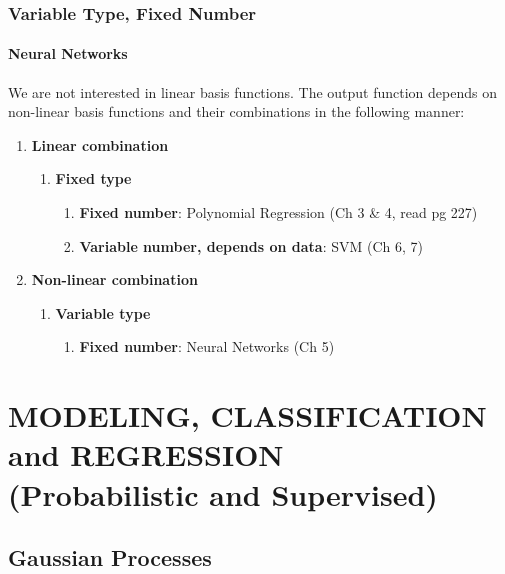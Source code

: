 \documentclass{book}
\begin{document}
\section{Variable Type, Fixed Number} 
\subsection{Neural Networks}

We are not interested in linear basis functions.
The output function depends on non-linear basis functions and their combinations in the following manner:

\begin{enumerate}
\item {\color{red}\textbf{Linear combination}}
\begin{enumerate}
\item {\color{OliveGreen}\textbf{Fixed type}}
\begin{enumerate}
\item {\color{blue}\textbf{Fixed number}}: Polynomial Regression (Ch 3 \& 4, read pg 227) 
\item {\color{blue}\textbf{Variable number, depends on data}}: SVM (Ch 6, 7)
\end{enumerate}
\end{enumerate}
\item {\color{red}\textbf{Non-linear combination}}
\begin{enumerate}
\item {\color{OliveGreen}\textbf{Variable type}}
\begin{enumerate}
\item {\color{blue}\textbf{Fixed number}}: Neural Networks (Ch 5)
\end{enumerate}
\end{enumerate}
\end{enumerate}




\part{MODELING, CLASSIFICATION and REGRESSION\\(Probabilistic and Supervised)}
\chapter{Gaussian Processes}
\end{document}

